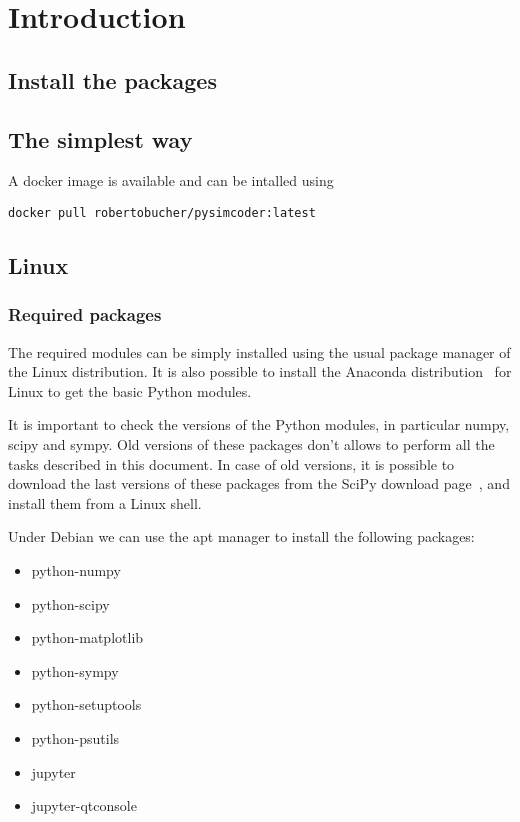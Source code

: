 \chapter{Introduction}

\section{Install the packages}

\section{The simplest way}
A docker image is available and can be intalled using

\begin{verbatim}
docker pull robertobucher/pysimcoder:latest
\end{verbatim}

\section{Linux}

\subsection{Required packages}

The required modules can be simply installed using the usual package manager 
of the Linux distribution.
It is also possible to install the Anaconda distribution~\cite{ANACONDA} for 
Linux to get the basic Python modules.

It is important to check the versions of the Python modules, in particular 
numpy, scipy and sympy. Old versions of these packages don't allows to perform 
all the tasks described in this document.
In case of old versions, it is possible to download the last versions of these 
packages 
from the SciPy download page~\cite{SCIPYDOWNLOAD}, and install them from a 
Linux 
shell.

Under Debian we can use the apt manager to install the 
following packages:
\begin{itemize}
\item python-numpy
\item python-scipy
\item python-matplotlib 
\item python-sympy
\item python-setuptools
\item python-psutils
\item jupyter
\item jupyter-qtconsole
\end{itemize}

